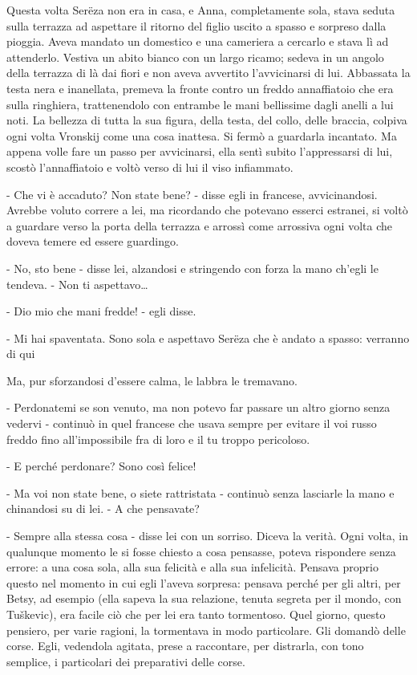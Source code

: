 Questa volta Serëza non era in casa, e Anna, completamente sola, stava seduta sulla terrazza ad aspettare il ritorno del figlio uscito a spasso e sorpreso dalla pioggia. Aveva mandato un domestico e una cameriera a cercarlo e stava lì ad attenderlo. Vestiva un abito bianco con un largo ricamo; sedeva in un angolo della terrazza di là dai fiori e non aveva avvertito l'avvicinarsi di lui. Abbassata la testa nera e inanellata, premeva la fronte contro un freddo annaffiatoio che era sulla ringhiera, trattenendolo con entrambe le mani bellissime dagli anelli a lui noti. La bellezza di tutta la sua figura, della testa, del collo, delle braccia, colpiva ogni volta Vronskij come una cosa inattesa. Si fermò a guardarla incantato. Ma appena volle fare un passo per avvicinarsi, ella sentì subito l'appressarsi di lui, scostò l'annaffiatoio e voltò verso di lui il viso infiammato. 

- Che vi è accaduto? Non state bene? - disse egli in francese, avvicinandosi. Avrebbe voluto correre a lei, ma ricordando che potevano esserci estranei, si voltò a guardare verso la porta della terrazza e arrossì come arrossiva ogni volta che doveva temere ed essere guardingo. 

- No, sto bene - disse lei, alzandosi e stringendo con forza la mano ch'egli le tendeva. - Non ti aspettavo\ldots{} 

- Dio mio che mani fredde! - egli disse. 

- Mi hai spaventata. Sono sola e aspettavo Serëza che è andato a spasso: verranno di qui 

Ma, pur sforzandosi d'essere calma, le labbra le tremavano. 

- Perdonatemi se son venuto, ma non potevo far passare un altro giorno senza vedervi - continuò in quel francese che usava sempre per evitare il voi russo freddo fino all'impossibile fra di loro e il tu troppo pericoloso. 

- E perché perdonare? Sono così felice! 

- Ma voi non state bene, o siete rattristata - continuò senza lasciarle la mano e chinandosi su di lei. - A che pensavate? 

- Sempre alla stessa cosa - disse lei con un sorriso. Diceva la verità. Ogni volta, in qualunque momento le si fosse chiesto a cosa pensasse, poteva rispondere senza errore: a una cosa sola, alla sua felicità e alla sua infelicità. Pensava proprio questo nel momento in cui egli l'aveva sorpresa: pensava perché per gli altri, per Betsy, ad esempio (ella sapeva la sua relazione, tenuta segreta per il mondo, con Tuškevic), era facile ciò che per lei era tanto tormentoso. Quel giorno, questo pensiero, per varie ragioni, la tormentava in modo particolare. Gli domandò delle corse. Egli, vedendola agitata, prese a raccontare, per distrarla, con tono semplice, i particolari dei preparativi delle corse. 

